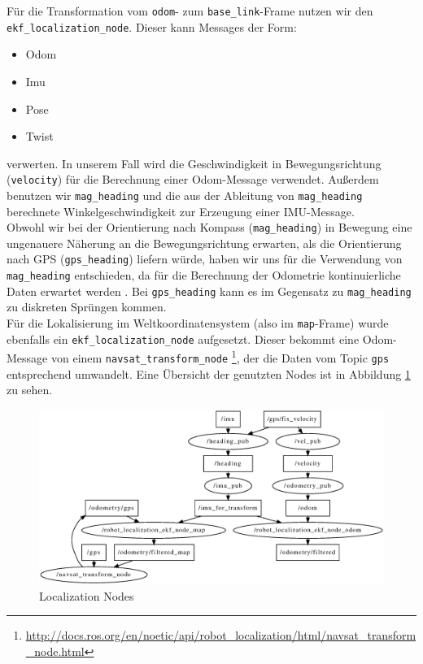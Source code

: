 \documentclass[11pt]{article}
\begin{document}
Für die Transformation vom \texttt{odom}- zum \texttt{base\_link}-Frame nutzen wir den \texttt{ekf\_localization\_node}. Dieser kann Messages der Form:
\begin{itemize}
	\item Odom
	\item Imu
	\item Pose
	\item Twist
\end{itemize}
verwerten.
In unserem Fall wird die Geschwindigkeit in Bewegungsrichtung (\texttt{velocity}) für die Berechnung einer Odom-Message verwendet.
Außerdem benutzen wir \texttt{mag\_heading} und die aus der Ableitung von \texttt{mag\_heading} berechnete Winkelgeschwindigkeit zur Erzeugung einer IMU-Message.\\
Obwohl wir bei der Orientierung nach Kompass (\texttt{mag\_heading}) in Bewegung eine ungenauere Näherung an die Bewegungsrichtung erwarten, als die Orientierung nach GPS (\texttt{gps\_heading}) liefern würde, haben wir uns für die Verwendung von \texttt{mag\_heading} entschieden, da für die Berechnung der Odometrie kontinuierliche Daten erwartet werden \cite{REP105}. Bei \texttt{gps\_heading} kann es im Gegensatz zu \texttt{mag\_heading} zu diskreten Sprüngen kommen.\\

Für die Lokalisierung im Weltkoordinatensystem (also im \texttt{map}-Frame) wurde ebenfalls ein \texttt{ekf\_localization\_node} aufgesetzt. Dieser bekommt eine Odom-Message von einem \texttt{navsat\_transform\_node} \footnote{\url{http://docs.ros.org/en/noetic/api/robot_localization/html/navsat_transform_node.html}}, der die Daten vom Topic \texttt{gps} entsprechend umwandelt. Eine Übersicht der genutzten Nodes ist in Abbildung \ref{localization-overview} zu sehen.

\begin{figure}
	\includegraphics[width=\linewidth]{localization-nodes}
	\caption{Localization Nodes}
	\label{localization-overview}
\end{figure}
\end{document}
